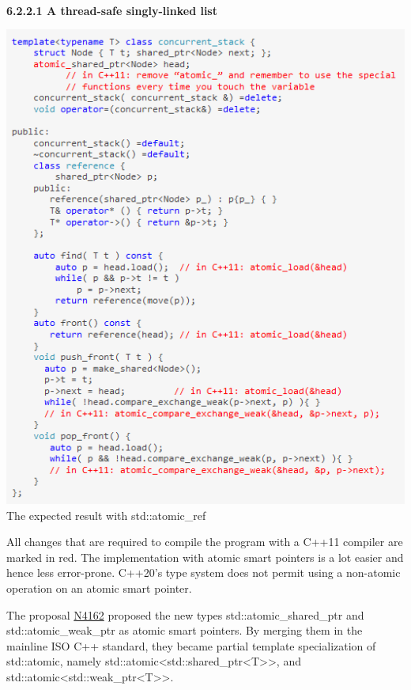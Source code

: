 \hspace*{\fill} \\ %
\noindent
\textbf{6.2.2.1\hspace{0.2cm} A thread-safe singly-linked list}

\begin{center}
\includegraphics[width=1.0\textwidth]{content/3/chapter6/images/11.png} \\
The expected result with std::atomic\_ref
\end{center}

All changes that are required to compile the program with a C++11 compiler are marked in red. The implementation with atomic smart pointers is a lot easier and hence less error-prone. C++20’s type system does not permit using a non-atomic operation on an atomic smart pointer.

The proposal \href{http://wg21.link/n4162}{N4162} proposed the new types std::atomic\_shared\_ptr and std::atomic\_weak\_ptr as atomic smart pointers. By merging them in the mainline ISO C++ standard, they became partial template specialization of std::atomic, namely std::atomic<std::shared\_ptr<T>{}>, and std::atomic<std::weak\_ptr<T>{}>.

